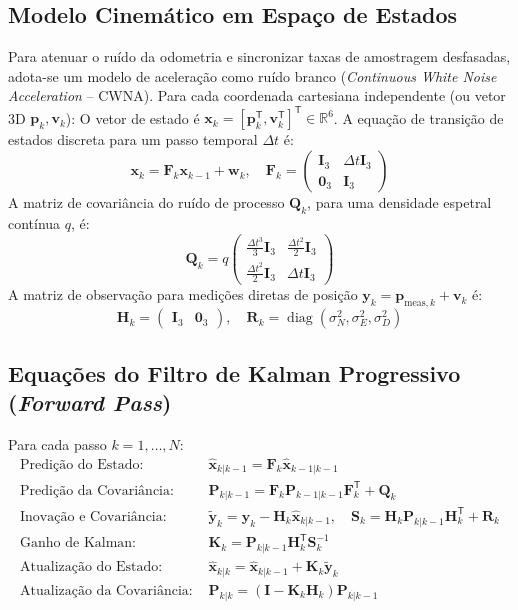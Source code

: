 \documentclass[11pt,a4paper]{article}
\newcommand{\vv}[1]{\mathbf{#1}}
\newcommand{\Id}{\mathbf{I}}
\newcommand{\T}{^{\mathsf{T}}}
\theoremstyle{definition}
\begin{document}
\subsection{Modelo Cinemático em Espaço de Estados}
Para atenuar o ruído da odometria e sincronizar taxas de amostragem desfasadas, adota-se um modelo de aceleração como ruído branco (\textit{Continuous White Noise Acceleration} -- CWNA). Para cada coordenada cartesiana independente (ou vetor 3D $\vv{p}_k, \vv{v}_k$):
O vetor de estado é $\vv{x}_k = [\vv{p}_k\T, \vv{v}_k\T]\T \in \mathbb{R}^6$.
A equação de transição de estados discreta para um passo temporal $\Delta t$ é:
\begin{equation}
    \vv{x}_{k} = \mathbf{F}_k \vv{x}_{k-1} + \vv{w}_k, \quad \mathbf{F}_k = \begin{pmatrix} \Id_3 & \Delta t \Id_3 \\ \mathbf{0}_3 & \Id_3 \end{pmatrix}
\end{equation}
A matriz de covariância do ruído de processo $\mathbf{Q}_k$, para uma densidade espetral contínua $q$, é:
\begin{equation}
    \mathbf{Q}_k = q \begin{pmatrix} \frac{\Delta t^3}{3}\Id_3 & \frac{\Delta t^2}{2}\Id_3 \\ \frac{\Delta t^2}{2}\Id_3 & \Delta t \Id_3 \end{pmatrix}
\end{equation}
A matriz de observação para medições diretas de posição $\vv{y}_k = \vv{p}_{\text{meas}, k} + \vv{v}_k$ é:
\begin{equation}
    \mathbf{H}_k = \begin{pmatrix} \Id_3 & \mathbf{0}_3 \end{pmatrix}, \quad \mathbf{R}_k = \operatorname{diag}(\sigma_N^2, \sigma_E^2, \sigma_D^2)
\end{equation}

\subsection{Equações do Filtro de Kalman Progressivo (\textit{Forward Pass})}
Para cada passo $k = 1, \dots, N$:
\begin{align}
    \text{Predição do Estado: } &\hat{\vv{x}}_{k|k-1} = \mathbf{F}_k \hat{\vv{x}}_{k-1|k-1} \\
    \text{Predição da Covariância: } &\mathbf{P}_{k|k-1} = \mathbf{F}_k \mathbf{P}_{k-1|k-1} \mathbf{F}_k\T + \mathbf{Q}_k \\
    \text{Inovação e Covariância: } &\tilde{\vv{y}}_k = \vv{y}_k - \mathbf{H}_k \hat{\vv{x}}_{k|k-1}, \quad \mathbf{S}_k = \mathbf{H}_k \mathbf{P}_{k|k-1}\mathbf{H}_k\T + \mathbf{R}_k \\
    \text{Ganho de Kalman: } &\mathbf{K}_k = \mathbf{P}_{k|k-1}\mathbf{H}_k\T \mathbf{S}_k^{-1} \\
    \text{Atualização do Estado: } &\hat{\vv{x}}_{k|k} = \hat{\vv{x}}_{k|k-1} + \mathbf{K}_k \tilde{\vv{y}}_k \\
    \text{Atualização da Covariância: } &\mathbf{P}_{k|k} = (\Id - \mathbf{K}_k \mathbf{H}_k)\mathbf{P}_{k|k-1}
\end{align}
\end{document}
